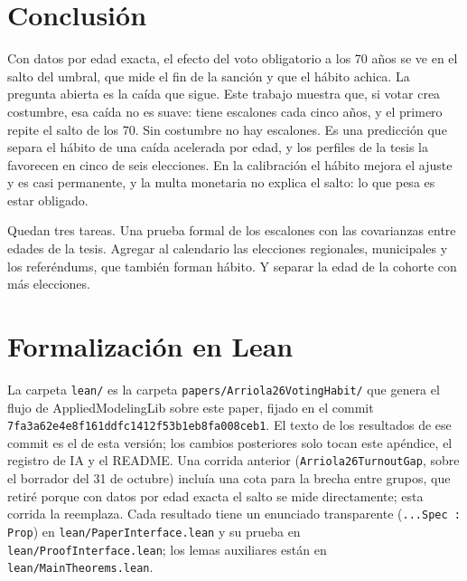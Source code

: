 \documentclass[11pt]{article}
\theoremstyle{definition}
\newcommand{\1}{\mathbbm{1}}
\providecommand{\leanPaperCommit}{7fa3a62e4e8f161ddfc1412f53b1eb8fa008ceb1}
\begin{document}
\section{Conclusión}\label{sec:concl}

Con datos por edad exacta, el efecto del voto obligatorio a los 70 años se ve en el salto del umbral,
que mide el fin de la sanción y que el hábito achica. La pregunta abierta es la caída que sigue. Este
trabajo muestra que, si votar crea costumbre, esa caída no es suave: tiene escalones cada cinco años,
y el primero repite el salto de los 70. Sin costumbre no hay escalones. Es una predicción que separa
el hábito de una caída acelerada por edad, y los perfiles de la tesis la favorecen en cinco de seis
elecciones. En la calibración el hábito mejora el ajuste y es casi permanente, y la multa monetaria
no explica el salto: lo que pesa es estar obligado.

Quedan tres tareas. Una prueba formal de los escalones con las covarianzas entre edades de la tesis.
Agregar al calendario las elecciones regionales, municipales y los referéndums, que también forman
hábito. Y separar la edad de la cohorte con más elecciones.




\appendix
\sloppy

\section{Formalización en Lean}\label{app:lean}

La carpeta \texttt{lean/} es la carpeta \texttt{papers/Arriola26VotingHabit/} que genera el flujo de
AppliedModelingLib sobre este paper, fijado en el commit \texttt{\leanPaperCommit}. El texto de los
resultados de ese commit es el de esta versión; los cambios posteriores solo tocan este apéndice, el
registro de IA y el README. Una corrida anterior (\texttt{Arriola26TurnoutGap}, sobre el borrador del
31 de octubre) incluía una cota para la brecha entre grupos, que retiré porque con datos por edad
exacta el salto se mide directamente; esta corrida la reemplaza. Cada resultado tiene un enunciado
transparente (\texttt{...Spec : Prop}) en \texttt{lean/PaperInterface.lean} y su prueba en
\texttt{lean/ProofInterface.lean}; los lemas auxiliares están en \texttt{lean/MainTheorems.lean}.
\end{document}
